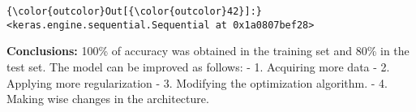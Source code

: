 \documentclass[11pt]{article}
\begin{document}
\begin{Verbatim}[commandchars=\\\{\}]
{\color{outcolor}Out[{\color{outcolor}42}]:} <keras.engine.sequential.Sequential at 0x1a0807bef28>
\end{Verbatim}
            
    \textbf{Conclusions:} 100\% of accuracy was obtained in the training set
and 80\% in the test set. The model can be improved as follows: - 1.
Acquiring more data - 2. Applying more regularization - 3. Modifying the
optimization algorithm. - 4. Making wise changes in the architecture.


    
    
    
    
\end{document}
